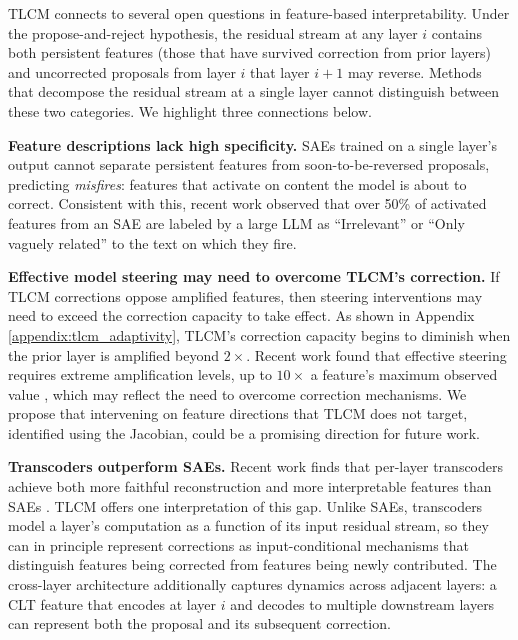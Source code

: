 
TLCM connects to several open questions in feature-based interpretability. Under the propose-and-reject hypothesis, the residual stream at any layer $i$ contains both persistent features (those that have survived correction from prior layers) and uncorrected proposals from layer $i$ that layer $i+1$ may reverse. Methods that decompose the residual stream at a single layer cannot distinguish between these two categories. We highlight three connections below.

\textbf{Feature descriptions lack high specificity.} SAEs trained on a single layer's output cannot separate persistent features from soon-to-be-reversed proposals, predicting \textit{misfires}: features that activate on content the model is about to correct. Consistent with this, recent work \cite{templeton2024scaling} observed that over 50\% of activated features from an SAE are labeled by a large LLM as ``Irrelevant'' or ``Only vaguely related'' to the text on which they fire.

\textbf{Effective model steering may need to overcome TLCM's correction.} If TLCM corrections oppose amplified features, then steering interventions may need to exceed the correction capacity to take effect. As shown in Appendix \ref{appendix:tlcm_adaptivity}, TLCM's correction capacity begins to diminish when the prior layer is amplified beyond $2\times$. Recent work found that effective steering requires extreme amplification \textbf{}levels, up to $10\times$ a feature's maximum observed value \cite{templeton2024scaling}, which may reflect the need to overcome correction mechanisms. We propose that intervening on feature directions that TLCM does not target, identified using the Jacobian, could be a promising direction for future work.

\textbf{Transcoders outperform SAEs.} Recent work finds that per-layer transcoders achieve both more faithful reconstruction and more interpretable features than SAEs \cite{paulo2025transcodersbeatsparseautoencoders}. TLCM offers one interpretation of this gap. Unlike SAEs, transcoders model a layer's computation as a function of its input residual stream, so they can in principle represent corrections as input-conditional mechanisms that distinguish features being corrected from features being newly contributed. The cross-layer architecture \cite{ameisen2025circuit} additionally captures dynamics across adjacent layers: a CLT feature that encodes at layer $i$ and decodes to multiple downstream layers can represent both the proposal and its subsequent correction.

